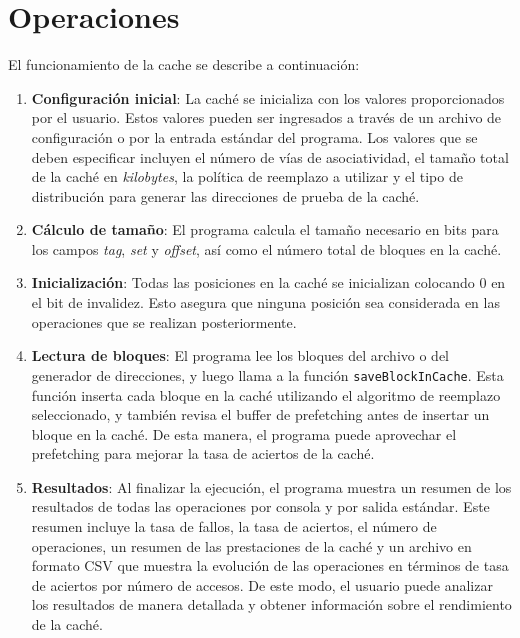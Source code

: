 \documentclass[12pt]{article}
\begin{document}
\section*{Operaciones}
\vspace{-5pt}
El funcionamiento de la cache se describe a continuación:

\begin{enumerate}
	\item \textbf{Configuración inicial}: La caché se inicializa con los valores proporcionados por el usuario. Estos valores pueden ser ingresados a través de un archivo de configuración o por la entrada estándar del programa. Los valores que se deben especificar incluyen el número de vías de asociatividad, el tamaño total de la caché en \textit{kilobytes}, la política de reemplazo a utilizar y el tipo de distribución para generar las direcciones de prueba de la caché.
	
	\item \textbf{Cálculo de tamaño}: El programa calcula el tamaño necesario en bits para los campos \textit{tag}, \textit{set} y \textit{offset}, así como el número total de bloques en la caché.
	
	\item \textbf{Inicialización}: Todas las posiciones en la caché se inicializan colocando 0 en el bit de invalidez. Esto asegura que ninguna posición sea considerada en las operaciones que se realizan posteriormente.
	
	\item \textbf{Lectura de bloques}: El programa lee los bloques del archivo o del generador de direcciones, y luego llama a la función \lstinline|saveBlockInCache|. Esta función inserta cada bloque en la caché utilizando el algoritmo de reemplazo seleccionado, y también revisa el buffer de prefetching antes de insertar un bloque en la caché. De esta manera, el programa puede aprovechar el prefetching para mejorar la tasa de aciertos de la caché.
	
	\item \textbf{Resultados}: Al finalizar la ejecución, el programa muestra un resumen de los resultados de todas las operaciones por consola y por salida estándar. Este resumen incluye la tasa de fallos, la tasa de aciertos, el número de operaciones, un resumen de las prestaciones de la caché y un archivo en formato CSV que muestra la evolución de las operaciones en términos de tasa de aciertos por número de accesos. De este modo, el usuario puede analizar los resultados de manera detallada y obtener información sobre el rendimiento de la caché.
\end{enumerate}
%
\end{document}

